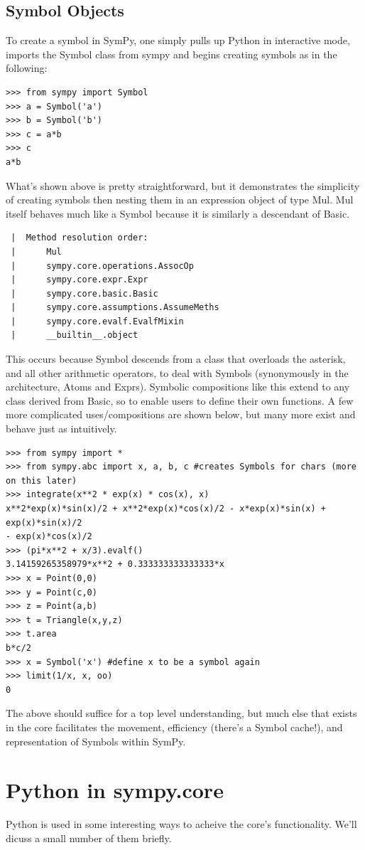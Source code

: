 \documentclass[11pt,a4paper,oneside]{report}
\begin{document}
\subsection*{Symbol Objects}
To create a symbol in SymPy, one simply pulls up Python in interactive mode, imports the Symbol class from sympy and begins creating symbols as in the following:
\begin{verbatim}
>>> from sympy import Symbol
>>> a = Symbol('a')
>>> b = Symbol('b')
>>> c = a*b
>>> c
a*b
\end{verbatim}
What's shown above is pretty straightforward, but it demonstrates the simplicity of creating symbols then nesting them in an expression object of type Mul. Mul itself behaves much like a Symbol because it is similarly a descendant of Basic.
\begin{verbatim}
 |  Method resolution order:
 |      Mul
 |      sympy.core.operations.AssocOp
 |      sympy.core.expr.Expr
 |      sympy.core.basic.Basic
 |      sympy.core.assumptions.AssumeMeths
 |      sympy.core.evalf.EvalfMixin
 |      __builtin__.object
\end{verbatim}
This occurs because Symbol descends from a class that overloads the asterisk, and all other arithmetic operators, to deal with Symbols (synonymously in the architecture, Atoms and Exprs). Symbolic compositions like this extend to any class derived from Basic, so to enable users to define their own functions. A few more complicated uses/compositions are shown below, but many more exist and behave just as intuitively.
\begin{verbatim}
>>> from sympy import *
>>> from sympy.abc import x, a, b, c #creates Symbols for chars (more on this later)
>>> integrate(x**2 * exp(x) * cos(x), x)
x**2*exp(x)*sin(x)/2 + x**2*exp(x)*cos(x)/2 - x*exp(x)*sin(x) + exp(x)*sin(x)/2 
- exp(x)*cos(x)/2
>>> (pi*x**2 + x/3).evalf()
3.14159265358979*x**2 + 0.333333333333333*x
>>> x = Point(0,0)
>>> y = Point(c,0)
>>> z = Point(a,b)
>>> t = Triangle(x,y,z)
>>> t.area
b*c/2
>>> x = Symbol('x') #define x to be a symbol again
>>> limit(1/x, x, oo)
0
\end{verbatim}
The above should suffice for a top level understanding, but much else that exists in the core facilitates the movement, efficiency (there's a Symbol cache!), and representation of Symbols within SymPy.
\section*{Python in sympy.core}
Python is used in some interesting ways to acheive the core's functionality. We'll dicuss a small number of them briefly.
\end{document}
